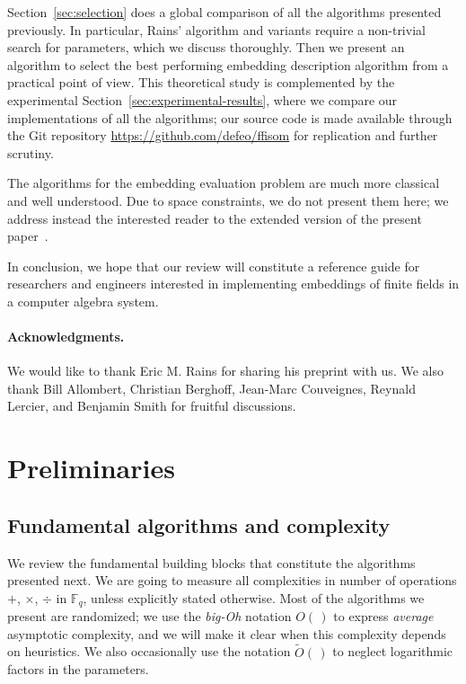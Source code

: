 \documentclass{mcom-l}
\theoremstyle{plain}
\theoremstyle{definition}
\newcommand{\tildO}{\tilde{O}}
\newcommand{\F}{\ensuremath{\mathbb{F}}}
\newcounter{algorithm}
\begin{document}
Section~\ref{sec:selection} does a global comparison of all the
algorithms presented previously. %
In particular, Rains' algorithm and variants require a non-trivial
search for parameters, which we discuss thoroughly. %
Then we present an algorithm to select the best performing embedding
description algorithm from a practical point of view. %
This theoretical study is complemented by the experimental
Section~\ref{sec:experimental-results}, where we compare our
implementations of all the algorithms; our source code is made
available through the Git repository
\url{https://github.com/defeo/ffisom} for replication and further
scrutiny.

The algorithms for the embedding evaluation problem are much more
classical and well understood. %
Due to space constraints, we do not present them here; we address
instead the interested reader to the extended version of the present
paper~\cite{ffisom-long}.

In conclusion, we hope that our review will constitute a reference
guide for researchers and engineers interested in implementing
embeddings of finite fields in a computer algebra system.

\paragraph{\bf Acknowledgments.}
We would like to thank Eric M. Rains for sharing his preprint with
us. %
We also thank Bill Allombert, Christian Berghoff, Jean-Marc
Couveignes, Reynald Lercier, and Benjamin Smith for fruitful
discussions.


\section{Preliminaries}
\label{sec:preliminaries}

\subsection{Fundamental algorithms and complexity}
\label{sec:fundamentalgo}
We review the fundamental building blocks that constitute the
algorithms presented next.  We are going to measure all complexities
in number of operations $+$, $\times$, $\div$ in $\F_q$, unless
explicitly stated otherwise. Most of the algorithms we present are
randomized; we use the \emph{big-Oh} notation $O(\,)$ to express {\em average}
asymptotic complexity, and we will make it clear when this complexity
depends on heuristics. We also occasionally use the notation
$\tildO(\,)$ to neglect logarithmic factors in the parameters.
\end{document}
